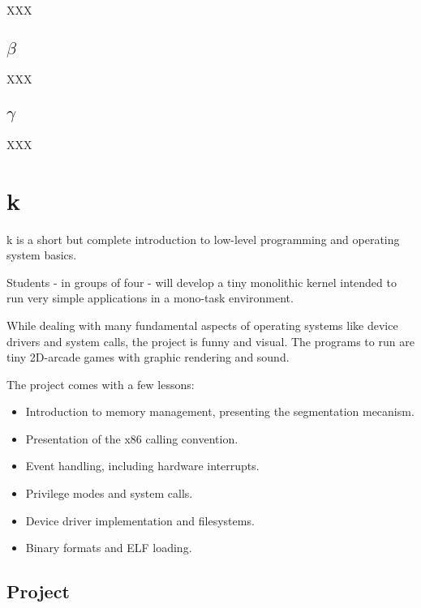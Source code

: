 \begin{multicols}{2}
XXX

%
%

\subsection{$\beta$}

XXX

%
%

\subsection{$\gamma$}

XXX

%
%

\section{k}

k is a short but complete introduction to low-level programming and
operating system basics.

Students - in groups of four - will develop a tiny monolithic kernel
intended to run very simple applications in a mono-task environment.

While dealing with many fundamental aspects of operating systems like
device drivers and system calls, the project is funny and visual. The
programs to run are tiny 2D-arcade games with graphic rendering and
sound.

The project comes with a few lessons:

\begin{itemize}
  \item
    Introduction to memory management, presenting the segmentation
    mecanism.
  \item
    Presentation of the x86 calling convention.
  \item
    Event handling, including hardware interrupts.
  \item
    Privilege modes and system calls.
  \item
    Device driver implementation and filesystems.
  \item
    Binary formats and ELF loading.
\end{itemize}

%
%

\subsection{Project}


\end{multicols}
